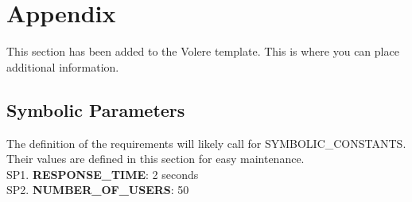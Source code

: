 \documentclass[12pt, titlepage]{article}
\begin{document}


\newpage

\section{Appendix}

This section has been added to the Volere template.  This is where you can place
additional information.

\subsection{Symbolic Parameters}

The definition of the requirements will likely call for SYMBOLIC\_CONSTANTS.
Their values are defined in this section for easy maintenance.\\

\noindent SP1. \textbf{RESPONSE\_TIME}: 2 seconds \\
SP2. \textbf{NUMBER\_OF\_USERS}: 50
\end{document}
